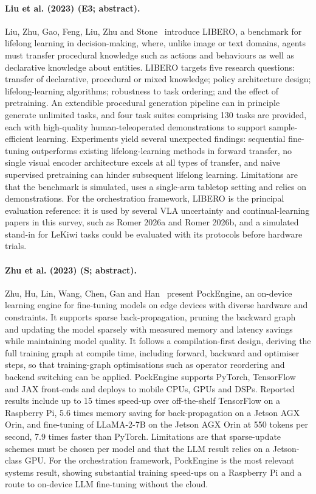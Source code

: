 \documentclass[10pt,a4paper]{article}
\begin{document}
\paragraph{Liu et al. (2023) (E3; abstract).} Liu, Zhu, Gao, Feng, Liu, Zhu and Stone~\cite{Liu2023b} introduce LIBERO, a benchmark for lifelong learning in decision-making, where, unlike image or text domains, agents must transfer procedural knowledge such as actions and behaviours as well as declarative knowledge about entities. LIBERO targets five research questions: transfer of declarative, procedural or mixed knowledge; policy architecture design; lifelong-learning algorithms; robustness to task ordering; and the effect of pretraining. An extendible procedural generation pipeline can in principle generate unlimited tasks, and four task suites comprising 130 tasks are provided, each with high-quality human-teleoperated demonstrations to support sample-efficient learning. Experiments yield several unexpected findings: sequential fine-tuning outperforms existing lifelong-learning methods in forward transfer, no single visual encoder architecture excels at all types of transfer, and naive supervised pretraining can hinder subsequent lifelong learning. Limitations are that the benchmark is simulated, uses a single-arm tabletop setting and relies on demonstrations. For the orchestration framework, LIBERO is the principal evaluation reference: it is used by several VLA uncertainty and continual-learning papers in this survey, such as Romer 2026a and Romer 2026b, and a simulated stand-in for LeKiwi tasks could be evaluated with its protocols before hardware trials.

\paragraph{Zhu et al. (2023) (S; abstract).} Zhu, Hu, Lin, Wang, Chen, Gan and Han~\cite{Zhu2023} present PockEngine, an on-device learning engine for fine-tuning models on edge devices with diverse hardware and constraints. It supports sparse back-propagation, pruning the backward graph and updating the model sparsely with measured memory and latency savings while maintaining model quality. It follows a compilation-first design, deriving the full training graph at compile time, including forward, backward and optimiser steps, so that training-graph optimisations such as operator reordering and backend switching can be applied. PockEngine supports PyTorch, TensorFlow and JAX front-ends and deploys to mobile CPUs, GPUs and DSPs. Reported results include up to 15 times speed-up over off-the-shelf TensorFlow on a Raspberry Pi, 5.6 times memory saving for back-propagation on a Jetson AGX Orin, and fine-tuning of LLaMA-2-7B on the Jetson AGX Orin at 550 tokens per second, 7.9 times faster than PyTorch. Limitations are that sparse-update schemes must be chosen per model and that the LLM result relies on a Jetson-class GPU. For the orchestration framework, PockEngine is the most relevant systems result, showing substantial training speed-ups on a Raspberry Pi and a route to on-device LLM fine-tuning without the cloud.
\end{document}
